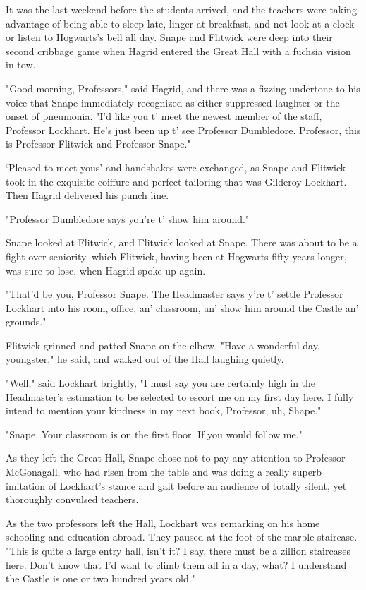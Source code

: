 It was the last weekend before the students arrived, and the teachers were taking advantage of being able to sleep late, linger at breakfast, and not look at a clock or listen to Hogwarts's bell all day. Snape and Flitwick were deep into their second cribbage game when Hagrid entered the Great Hall with a fuchsia vision in tow.

"Good morning, Professors," said Hagrid, and there was a fizzing undertone to his voice that Snape immediately recognized as either suppressed laughter or the onset of pneumonia. "I'd like you t' meet the newest member of the staff, Professor Lockhart. He's just been up t' see Professor Dumbledore. Professor, this is Professor Flitwick and Professor Snape."

`Pleased-to-meet-yous' and handshakes were exchanged, as Snape and Flitwick took in the exquisite coiffure and perfect tailoring that was Gilderoy Lockhart. Then Hagrid delivered his punch line.

"Professor Dumbledore says you're t' show him around."

Snape looked at Flitwick, and Flitwick looked at Snape. There was about to be a fight over seniority, which Flitwick, having been at Hogwarts fifty years longer, was sure to lose, when Hagrid spoke up again.

"That'd be you, Professor Snape. The Headmaster says y're t' settle Professor Lockhart into his room, office, an' classroom, an' show him around the Castle an' grounds."

Flitwick grinned and patted Snape on the elbow. "Have a wonderful day, youngster," he said, and walked out of the Hall laughing quietly.

"Well," said Lockhart brightly, "I must say you are certainly high in the Headmaster's estimation to be selected to escort me on my first day here. I fully intend to mention your kindness in my next book, Professor, uh, Shape."

"Snape. Your classroom is on the first floor. If you would follow me."

As they left the Great Hall, Snape chose not to pay any attention to Professor McGonagall, who had risen from the table and was doing a really superb imitation of Lockhart's stance and gait before an audience of totally silent, yet thoroughly convulsed teachers.

As the two professors left the Hall, Lockhart was remarking on his home schooling and education abroad. They paused at the foot of the marble staircase. "This is quite a large entry hall, isn't it? I say, there must be a zillion staircases here. Don't know that I'd want to climb them all in a day, what? I understand the Castle is{\el} one or two hundred years old."

